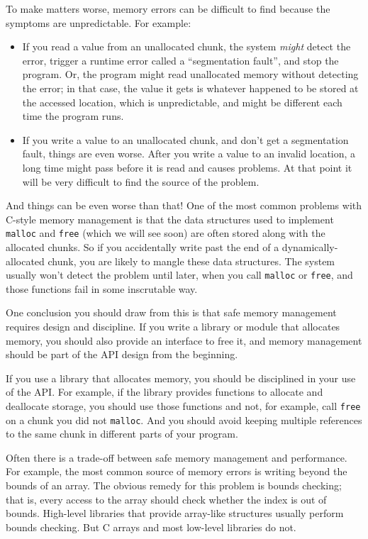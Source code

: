 \documentclass[12pt]{book}
\begin{document}
{To make matters worse, memory errors can be difficult
to find because the symptoms are unpredictable.  For example:

\begin{itemize}

\item If you read a value from an unallocated chunk, the system {\em might} detect the error, trigger a runtime error called a ``segmentation fault'', and stop the program.  Or, the program might read unallocated memory without detecting the error; in that case, the value it gets is whatever happened to be stored at the accessed location, which is unpredictable, and might be different each time the program runs.

\item If you write a value to an unallocated chunk, and don't get a segmentation fault, things are even worse.  After you write a value to an invalid location, a long time might pass before it is read and causes problems.  At that point it will be very difficult to find the source of the problem.

\end{itemize} 

And things can be even worse than that!  One of the most common
problems with C-style memory management is that the data structures
used to implement {\tt malloc} and {\tt free} (which we will see soon)
are often stored along with the allocated chunks.  So if you
accidentally write past the end of a dynamically-allocated chunk, you
are likely to mangle these data structures.  The system usually won't
detect the problem until later, when you call {\tt malloc} or
{\tt free}, and those functions fail in some inscrutable way.

One conclusion you should draw from this is that safe memory
management requires design and discipline.  If you write a library
or module that allocates memory, you should also provide an
interface to free it, and memory management should be part of
the API design from the beginning.

If you use a library that allocates memory, you should be disciplined
in your use of the API.  For example, if the library provides
functions to allocate and deallocate storage, you should use those
functions and not, for example, call {\tt free} on a chunk you did not
{\tt malloc}.  And you should avoid keeping multiple references to the
same chunk in different parts of your program.

Often there is a trade-off between safe memory management and performance.
For example, the most common source of memory errors is writing 
beyond the bounds of an array.  The obvious remedy for this problem
is bounds checking; that is, every access to the array should check
whether the index is out of bounds.  High-level libraries that provide
array-like structures usually perform bounds checking.  But C arrays
and most low-level libraries do not.


}
\end{document}
